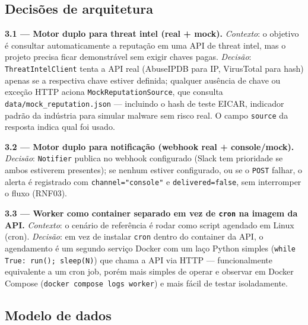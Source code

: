 \documentclass[11pt,a4paper]{article}
\begin{document}
\subsection{Decisões de arquitetura}

\textbf{3.1 --- Motor duplo para threat intel (real + mock).}
\textit{Contexto}: o objetivo é consultar automaticamente a reputação em uma API de
threat intel, mas o projeto precisa ficar demonstrável sem exigir chaves pagas.
\textit{Decisão}: \texttt{ThreatIntelClient} tenta a API real (AbuseIPDB para IP,
VirusTotal para hash) apenas se a respectiva chave estiver definida; qualquer ausência
de chave ou exceção HTTP aciona \texttt{MockReputationSource}, que consulta
\texttt{data/mock\_reputation.json} --- incluindo o hash de teste EICAR, indicador
padrão da indústria para simular malware sem risco real. O campo \texttt{source} da
resposta indica qual foi usado.

\textbf{3.2 --- Motor duplo para notificação (webhook real + console/mock).}
\textit{Decisão}: \texttt{Notifier} publica no webhook configurado (Slack tem
prioridade se ambos estiverem presentes); se nenhum estiver configurado, ou se o
\texttt{POST} falhar, o alerta é registrado com \texttt{channel="console"} e
\texttt{delivered=false}, sem interromper o fluxo (RNF03).

\textbf{3.3 --- Worker como container separado em vez de \texttt{cron} na imagem da
API.} \textit{Contexto}: o cenário de referência é rodar como script agendado em Linux
(cron). \textit{Decisão}: em vez de instalar \texttt{cron} dentro do container da
API, o agendamento é um segundo serviço Docker com um laço Python simples
(\texttt{while True: run(); sleep(N)}) que chama a API via HTTP --- funcionalmente
equivalente a um cron job, porém mais simples de operar e observar em Docker Compose
(\texttt{docker compose logs worker}) e mais fácil de testar isoladamente.

\subsection{Modelo de dados}
\end{document}
